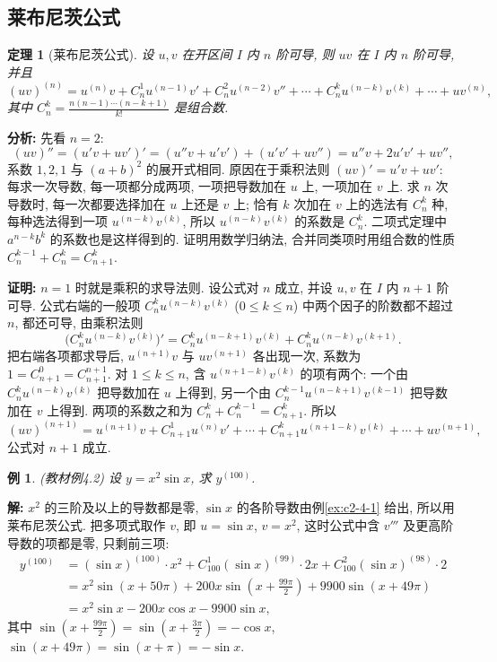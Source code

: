\documentclass[UTF8,openany]{ctexbook}
\theoremstyle{chinesetextbook}
\newtheorem{example}{例}[section]
\newenvironment{cnproof}{\par\indent\textbf{证明:} \ignorespaces}{\par}
\newenvironment{cnsolution}{\par\indent\textbf{解:} \ignorespaces}{\par}
\newtheorem*{theoremsingle}{定理}
\begin{document}
\subsection{莱布尼茨公式}
\begin{theoremsingle}[莱布尼茨公式]
设 $u,v$ 在开区间 $I$ 内 $n$ 阶可导, 则 $uv$ 在 $I$ 内 $n$ 阶可导, 并且
\[
(uv)^{(n)}=u^{(n)}v+C_n^1u^{(n-1)}v'+C_n^2u^{(n-2)}v''+\cdots+C_n^ku^{(n-k)}v^{(k)}+\cdots+uv^{(n)},
\]
其中 $\displaystyle C_n^k=\frac{n(n-1)\cdots(n-k+1)}{k!}$ 是组合数.
\end{theoremsingle}
\par\indent\textbf{分析:} 先看 $n=2$:
\[
(uv)''=(u'v+uv')'=(u''v+u'v')+(u'v'+uv'')=u''v+2u'v'+uv'',
\]
系数 $1,2,1$ 与 $(a+b)^2$ 的展开式相同. 原因在于乘积法则 $(uv)'=u'v+uv'$: 每求一次导数, 每一项都分成两项, 一项把导数加在 $u$ 上, 一项加在 $v$ 上. 求 $n$ 次导数时, 每一次都要选择加在 $u$ 上还是 $v$ 上; 恰有 $k$ 次加在 $v$ 上的选法有 $C_n^k$ 种, 每种选法得到一项 $u^{(n-k)}v^{(k)}$, 所以 $u^{(n-k)}v^{(k)}$ 的系数是 $C_n^k$. 二项式定理中 $a^{n-k}b^k$ 的系数也是这样得到的. 证明用数学归纳法, 合并同类项时用组合数的性质 $C_n^{k-1}+C_n^k=C_{n+1}^k$.
\begin{cnproof}
$n=1$ 时就是乘积的求导法则. 设公式对 $n$ 成立, 并设 $u,v$ 在 $I$ 内 $n+1$ 阶可导. 公式右端的一般项 $C_n^ku^{(n-k)}v^{(k)}$ ($0\le k\le n$) 中两个因子的阶数都不超过 $n$, 都还可导, 由乘积法则
\[
\bigl(C_n^ku^{(n-k)}v^{(k)}\bigr)'=C_n^ku^{(n-k+1)}v^{(k)}+C_n^ku^{(n-k)}v^{(k+1)}.
\]
把右端各项都求导后, $u^{(n+1)}v$ 与 $uv^{(n+1)}$ 各出现一次, 系数为 $1=C_{n+1}^0=C_{n+1}^{n+1}$. 对 $1\le k\le n$, 含 $u^{(n+1-k)}v^{(k)}$ 的项有两个: 一个由 $C_n^ku^{(n-k)}v^{(k)}$ 把导数加在 $u$ 上得到, 另一个由 $C_n^{k-1}u^{(n-k+1)}v^{(k-1)}$ 把导数加在 $v$ 上得到. 两项的系数之和为 $C_n^k+C_n^{k-1}=C_{n+1}^k$. 所以
\[
(uv)^{(n+1)}=u^{(n+1)}v+C_{n+1}^1u^{(n)}v'+\cdots+C_{n+1}^ku^{(n+1-k)}v^{(k)}+\cdots+uv^{(n+1)},
\]
公式对 $n+1$ 成立.
\end{cnproof}
\begin{example}\label{ex:c2-4-2}
\textnormal{(教材例4.2)} 设 $y=x^2\sin x$, 求 $y^{(100)}$.
\end{example}
\begin{cnsolution}
$x^2$ 的三阶及以上的导数都是零, $\sin x$ 的各阶导数由例\ref{ex:c2-4-1} 给出, 所以用莱布尼茨公式. 把多项式取作 $v$, 即 $u=\sin x$, $v=x^2$, 这时公式中含 $v'''$ 及更高阶导数的项都是零, 只剩前三项:
\[
\begin{aligned}
y^{(100)}&=(\sin x)^{(100)}\cdot x^2+C_{100}^1(\sin x)^{(99)}\cdot2x+C_{100}^2(\sin x)^{(98)}\cdot2\\
&=x^2\sin(x+50\pi)+200x\sin\left(x+\frac{99\pi}2\right)+9900\sin(x+49\pi)\\
&=x^2\sin x-200x\cos x-9900\sin x,
\end{aligned}
\]
其中 $\displaystyle\sin\left(x+\frac{99\pi}2\right)=\sin\left(x+\frac{3\pi}2\right)=-\cos x$, $\sin(x+49\pi)=\sin(x+\pi)=-\sin x$.
\end{cnsolution}
\end{document}
